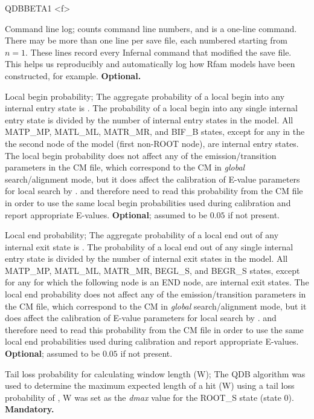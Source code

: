 \begin{sreitems}{QDBBETA1 <f>}
\item [\emprog{COM [<n>] <s>}] Command line log;  counts
command line numbers, and  is a one-line command. There may
be more than one  line per save file, each numbered starting
from $n=1$. These lines record every Infernal command that modified the
save file. This helps us reproducibly and automatically log how Rfam
models have been constructed, for example. \textbf{Optional.}

\item [\emprog{PBEGIN <f>}] Local begin probability; The aggregate
probability of a local begin into any internal entry state is
. The probability of a local begin into any single internal
entry state is  divided by the number of internal entry
states in the model. All MATP\_MP, MATL\_ML, MATR\_MR, and BIF\_B
states, except for any in the the second node of the model (first
non-ROOT node), are internal entry states. The local begin probability
does not affect any of the emission/transition parameters in the CM
file, which correspond to the CM in \emph{global} search/alignment
mode, but it does affect the calibration of E-value parameters for
local search by .  and 
therefore need to read this probability from the CM file in order to
use the same local begin probabilities used during calibration and
report appropriate E-values. \textbf{Optional}; assumed to be $0.05$
if not present.

\item [\emprog{PEND <f>}] Local end probability; The aggregate
probability of a local end out of any internal exit state is
. The probability of a local end out of any single internal
entry state is  divided by the number of internal exit
states in the model. All MATP\_MP, MATL\_ML, MATR\_MR, BEGL\_S, and
BEGR\_S states, except for any for which the following node is an END
node, are internal exit states. The local end probability
does not affect any of the emission/transition parameters in the CM
file, which correspond to the CM in \emph{global} search/alignment
mode, but it does affect the calibration of E-value parameters for
local search by .  and 
therefore need to read this probability from the CM file in order to
use the same local end probabilities used during calibration and
report appropriate E-values. \textbf{Optional}; assumed to be $0.05$
if not present.

\item [\emprog{WBETA <f>}] Tail loss probability for calculating
  window length (W); The QDB algorithm \citep{NawrockiEddy07} was used
  to determine the maximum expected length of a hit (W) using a tail
  loss probability of , W was set as the \emph{dmax} value for the
  ROOT\_S state (state 0). \textbf{Mandatory.}


\end{sreitems}
